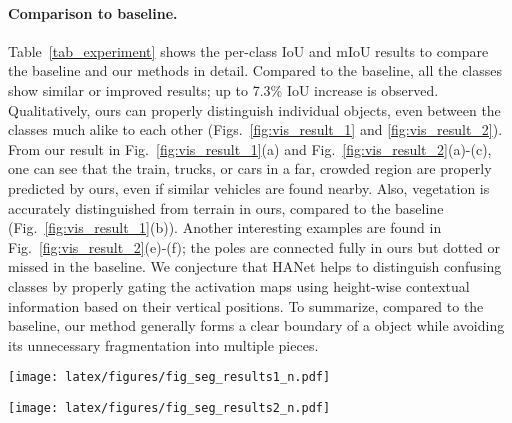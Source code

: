 \documentclass[10pt,twocolumn,letterpaper]{article}
\begin{document}
\paragraph{Comparison to baseline.}
Table~\ref{tab_experiment} shows the per-class IoU and mIoU results to compare the baseline and our methods in detail. 
Compared to the baseline, all the classes show similar or improved results; up to 7.3\% IoU increase is observed.
Qualitatively, ours can properly distinguish individual objects, even between the classes much alike to each other (Figs.~\ref{fig:vis_result_1} and \ref{fig:vis_result_2}). 
From our result in Fig.~\ref{fig:vis_result_1}(a) and Fig.~\ref{fig:vis_result_2}(a)-(c), one can see that the train, trucks, or cars in a far, crowded region are properly predicted by ours, even if similar vehicles are found nearby. 
Also, vegetation is accurately distinguished from terrain in ours, compared to the baseline (Fig.~\ref{fig:vis_result_1}(b)). 
Another interesting examples are found in  Fig.~\ref{fig:vis_result_2}(e)-(f);
the poles are connected fully in ours but dotted or missed in the baseline. 
We conjecture that HANet helps to distinguish confusing classes by properly gating the activation maps using height-wise contextual information based on their vertical positions. To summarize, compared to the baseline, our method generally forms a clear boundary of a object while avoiding its unnecessary fragmentation into multiple pieces. 









\begin{figure*}[!t]
\centering
  \texttt{[image: latex/figures/fig\_seg\_results1\_n.pdf]}
  \caption{Comparison of predicted segmentation maps: (a) truck, bus, and car. (b) vegetation and terrain. (c) motorcycle and bicycle. (d) fence and vegetation.}
\label{fig:vis_result_1}
\vspace*{+1.0cm}
\end{figure*}

\begin{figure*}[!t]
\centering
  \texttt{[image: latex/figures/fig\_seg\_results2\_n.pdf]}
  \caption{Comparison of predicted segmentation maps: (a) truck and car. (b) car and truck. (c) bus and car. (d) building and fence. (e) sky and building; pole and building. (f) pole and building.}
\label{fig:vis_result_2}
\vspace*{+1.0cm}
\end{figure*}
\end{document}
